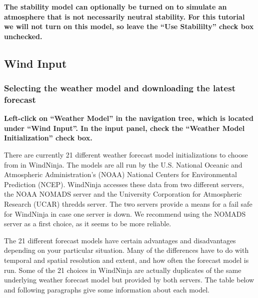 \documentclass[12pt]{article}
\begin{document}
\textbf{\color{red} The stability model can optionally be turned on to simulate an atmosphere that is not necessarily neutral stability.  For this tutorial we will not turn on this model, so leave the “Use Stabililty” check box unchecked.}

\subsection{Wind Input}

\subsubsection{Selecting the weather model and downloading the latest forecast}

\textbf{\color{red} Left-click on “Weather Model” in the navigation tree, which is located under  “Wind Input”.  In the input panel, check the “Weather Model Initialization” check box.}

There are currently 21 different weather forecast model initializations to choose from in WindNinja.  The models are all run by the U.S. National Oceanic and Atmospheric Administration's (NOAA) National Centers for Environmental Prediction (NCEP).  WindNinja accesses these data from two different servers, the NOAA NOMADS server and the University Corporation for Atmospheric Research (UCAR) thredds server.  The two servers provide a means for a fail safe for WindNinja in case one server is down.  We recommend using the NOMADS server as a first choice, as it seems to be more reliable.

The 21 different forecast models have certain advantages and disadvantages depending on your particular situation.  Many of the differences have to do with temporal and spatial resolution and extent, and how often the forecast model is run.  Some of the 21 choices in WindNinja are actually duplicates of the same underlying weather forecast model but provided by both servers.  The table below and following paragraphs give some information about each model.
\end{document}
